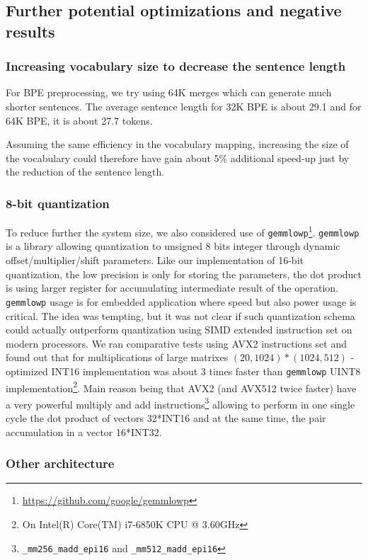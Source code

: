 \documentclass[11pt,a4paper]{article}
\begin{document}
\subsection{Further potential optimizations and negative results}

\subsubsection{Increasing vocabulary size to decrease the sentence length}
For BPE preprocessing, we try using 64K merges which can generate much shorter sentences.
The average sentence length for 32K BPE is about 29.1 and for 64K BPE, it is about 27.7 tokens.

Assuming the same efficiency in the vocabulary mapping, increasing the size of the vocabulary could therefore have gain about 5\% additional speed-up just by the reduction of the sentence length.

\subsubsection{8-bit quantization}

To reduce further the system size, we also considered use of {\tt gemmlowp}\footnote{\url{https://github.com/google/gemmlowp}}. {\tt gemmlowp} is a library allowing quantization to unsigned 8 bits integer through dynamic offset/multiplier/shift parameters. Like our implementation of 16-bit quantization, the low precision is only for storing the parameters, the dot product is using larger register for accumulating intermediate result of the operation. {\tt gemmlowp} usage is for embedded application where speed but also power usage is critical. The idea was tempting, but it was not clear if such quantization schema could actually outperform quantization using SIMD extended instruction set on modern processors. We ran  comparative tests using AVX2 instructions set and found out that for multiplications of large matrixes $(20,1024) * (1024,512)$ - optimized INT16 implementation was about 3 times faster than  {\tt gemmlowp} UINT8 implementation\footnote{On Intel(R) Core(TM) i7-6850K CPU @ 3.60GHz}. Main reason being that AVX2 (and AVX512 twice faster) have a very powerful multiply and add instructions\footnote{{\tt \_mm256\_madd\_epi16} and {\tt \_mm512\_madd\_epi16}} allowing to perform in one single cycle the dot product of vectors 32*INT16 and at the same time, the pair accumulation in a vector 16*INT32.

\subsubsection{Other architecture}
\end{document}

